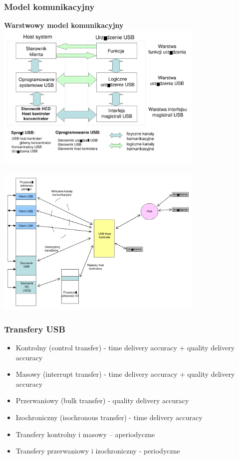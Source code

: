 \documentclass[a4paper,twoside]{article}
\begin{document}
		\subsubsection{Model komunikacyjny}
		\textbf{Warstwowy model komunikacyjny}\\
		\includegraphics[width=10cm]{./wyklady/USB_12_1.pdf}\\\\
		\includegraphics[width=10cm]{./wyklady/USB_13_1.pdf}\\
		\subsubsection{Transfery USB}
		\begin{itemize}
			\item Kontrolny (control transfer) - time delivery accuracy + quality delivery accuracy
			\item Masowy (interrupt transfer) - time delivery accuracy + quality delivery accuracy
			\item Przerwaniowy (bulk transfer) - quality delivery accuracy
			\item Izochroniczny (isochronous transfer) - time delivery accuracy
		\end{itemize}
		\begin{itemize}
			\item Transfery kontrolny i masowy – aperiodyczne
			\item Transfery przerwaniowy i izochroniczny - periodyczne
		\end{itemize}
\end{document}
